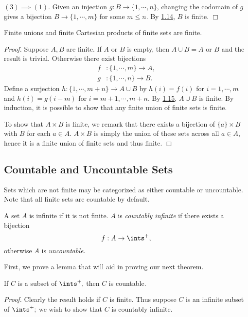 $(3) \implies (1).$ Given an injection $g: B \rightarrow \{1, \cdots, n\}$, changing the codomain of $g$ gives a bijection $B \rightarrow \{1, \cdots, m\}$ for some $m \leq n$. By \hyperref[1.14]{1.14}, $B$ is finite. $\Box$
\begin{corollary}\label{1.16}
    Finite unions and finite Cartesian products of finite sets are finite.
\end{corollary}

{\it Proof.} Suppose $A, B$ are finite. If $A$ or $B$ is empty, then $A \cup B = A$ or $B$ and the result is trivial. Otherwise there exist bijections
\begin{align*}
    f&: \{1, \cdots, m\} \rightarrow A, \\
    g&: \{1, \cdots, n\} \rightarrow B.
\end{align*}
Define a surjection $h: \{1, \cdots, m+n\} \rightarrow A\cup B$ by $h(i) = f(i)$ for $i = 1,\cdots, m$ and $h(i) = g(i-m)$ for $i = m+1 , \cdots, m+n$. By \hyperref[1.15]{1.15}, $A \cup B$ is finite. By induction, it is possible to show that any finite union of finite sets is finite.

To show that $A \times B$ is finite, we remark that there exists a bijection of $\{a\} \times B$ with $B$ for each $a \in A$. $A \times B$ is simply the union of these sets across all $a \in A$, hence it is a finite union of finite sets and thus finite. $\Box$

\subsection{Countable and Uncountable Sets}
Sets which are not finite may be categorized as either countable or uncountable. Note that all finite sets are countable by default.
\begin{definition}\label{1.17}
    A set $A$ is infinite if it is not finite. $A$ is {\it countably infinite} if there exists a bijection
    $$f: A \rightarrow \ints^+,$$
    otherwise $A$ is {\it uncountable}.
\end{definition}

First, we prove a lemma that will aid in proving our next theorem.
\begin{lemma}\label{1.18}
    If $C$ is a subset of $\ints^+,$ then $C$ is countable.
\end{lemma}

{\it Proof.} Clearly the result holds if $C$ is finite. Thus suppose $C$ is an infinite subset of $\ints^+;$ we wish to show that $C$ is countably infinite.

